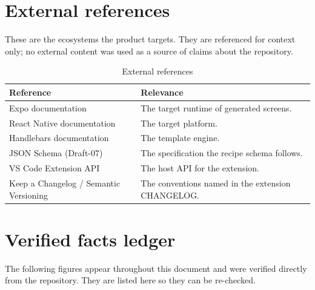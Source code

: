 \section{External references}

These are the ecosystems the product targets. They are referenced for context
only; no external content was used as a source of claims about the repository.

\begin{longtable}{p{5cm}p{9.2cm}}
\caption{External references}\\
\toprule
\textbf{Reference} & \textbf{Relevance} \\
\midrule

Expo documentation & The target runtime of generated screens. \\
React Native documentation & The target platform. \\
Handlebars documentation & The template engine. \\
JSON Schema (Draft-07) & The specification the recipe schema follows. \\
VS Code Extension API & The host API for the extension. \\
Keep a Changelog / Semantic Versioning & The conventions named in the extension
CHANGELOG. \\
\bottomrule
\end{longtable}

\section{Verified facts ledger}

The following figures appear throughout this document and were verified directly
from the repository. They are listed here so they can be re-checked.

